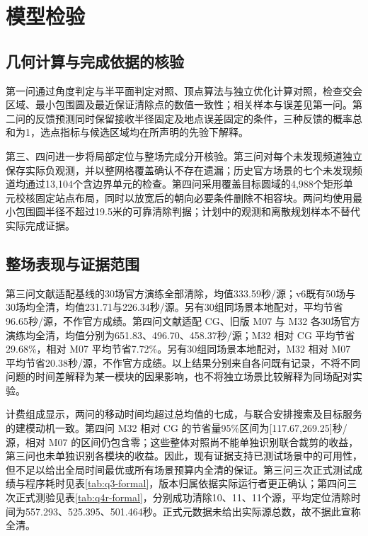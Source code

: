 \documentclass[UTF8,a4paper,zihao=-4,fontset=none]{ctexart}
\begin{document}
\FloatBarrier





\section{模型检验}

\subsection{几何计算与完成依据的核验}

第一问通过角度判定与半平面判定对照、顶点算法与独立优化计算对照，检查交会区域、最小包围圆及最近保证清除点的数值一致性；相关样本与误差见第一问。第二问的反馈预测同时保留接收半径固定及地点误差固定的条件，三种反馈的概率总和为1，选点指标与候选区域均在所声明的先验下解释。

第三、四问进一步将局部定位与整场完成分开核验。第三问对每个未发现频道独立保存实际负观测，并以整网格覆盖确认不存在遗漏；历史官方场景的七个未发现频道均通过13,104个含边界单元的检查。第四问采用覆盖目标圆域的4,988个矩形单元校核固定站点布局，同时以放宽后的朝向必要条件删除不相容块。两问均使用最小包围圆半径不超过19.5米的可靠清除判据；计划中的观测和离散规划样本不替代实际完成证据。

\subsection{整场表现与证据范围}

第三问文献适配基线的30场官方演练全部清除，均值333.59秒/源；v6既有50场与30场均全清，均值231.71与226.34秒/源。另有30组同场景本地配对，平均节省96.65秒/源，不作官方成绩。第四问文献适配 CG、旧版 M07 与 M32 各30场官方演练均全清，均值分别为651.83、496.70、458.37秒/源；M32 相对 CG 平均节省29.68\%，相对 M07 平均节省7.72\%。另有30组同场景本地配对，M32 相对 M07 平均节省20.38秒/源，不作官方成绩。以上结果分别来自各问既有记录，不将不同问题的时间差解释为某一模块的因果影响，也不将独立场景比较解释为同场配对实验。

计费组成显示，两问的移动时间均超过总均值的七成，与联合安排搜索及目标服务的建模动机一致。第四问 M32 相对 CG 的节省量95\%区间为[117.67,269.25]秒/源，相对 M07 的区间仍包含零；这些整体对照尚不能单独识别联合裁剪的收益，第三问也未单独识别各模块的收益。因此，现有证据支持已测试场景中的可用性，但不足以给出全局时间最优或所有场景预算内全清的保证。第三问三次正式测试成绩与程序耗时见表\ref{tab:q3-formal}，版本归属依据实际运行者更正确认；第四问三次正式测验见表\ref{tab:q4r-formal}，分别成功清除10、11、11个源，平均定位清除时间为557.293、525.395、501.464秒。正式元数据未给出实际源总数，故不据此宣称全清。
\end{document}
